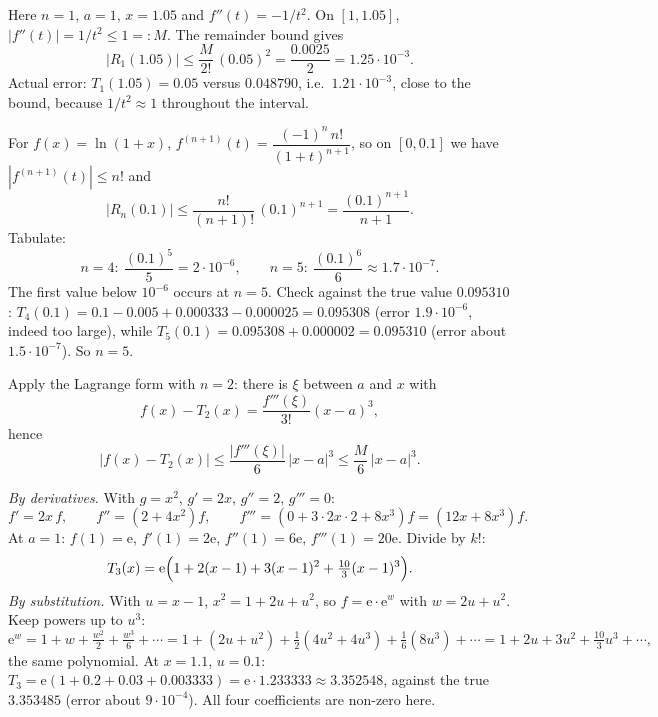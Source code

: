 \begin{solutions}
  \item Here $n=1$, $a=1$, $x=1.05$ and $f''(t)=-1/t^{2}$. On
        $[1,1.05]$, $|f''(t)|=1/t^{2}\leq 1=:M$. The remainder bound
        gives
        \[
          |R_{1}(1.05)|\leq\frac{M}{2!}\,(0.05)^{2}
            =\frac{0.0025}{2}=1.25\cdot 10^{-3} .
        \]
        Actual error: $T_{1}(1.05)=0.05$ versus $0.048790$, i.e.\
        $1.21\cdot 10^{-3}$, close to the bound, because
        $1/t^{2}\approx 1$ throughout the interval.

  \item For $f(x)=\ln(1+x)$,
        $f^{(n+1)}(t)=\dfrac{(-1)^{n}\,n!}{(1+t)^{n+1}}$, so on
        $[0,0.1]$ we have $|f^{(n+1)}(t)|\leq n!$ and
        \[
          |R_{n}(0.1)|\leq\frac{n!}{(n+1)!}\,(0.1)^{n+1}
            =\frac{(0.1)^{n+1}}{n+1} .
        \]
        Tabulate:
        \[
          n=4:\ \frac{(0.1)^{5}}{5}=2\cdot 10^{-6},
          \qquad
          n=5:\ \frac{(0.1)^{6}}{6}\approx 1.7\cdot 10^{-7} .
        \]
        The first value below $10^{-6}$ occurs at $n=5$. Check against
        the true value $0.095310$: $T_{4}(0.1)=0.1-0.005+0.000333
        -0.000025=0.095308$ (error $1.9\cdot 10^{-6}$, indeed too
        large), while $T_{5}(0.1)=0.095308+0.000002=0.095310$ (error
        about $1.5\cdot 10^{-7}$). So $n=5$.

  \item Apply the Lagrange form with $n=2$: there is $\xi$ between $a$
        and $x$ with
        \[
          f(x)-T_{2}(x)=\frac{f'''(\xi)}{3!}(x-a)^{3},
        \]
        hence
        \[
          |f(x)-T_{2}(x)|\leq\frac{|f'''(\xi)|}{6}\,|x-a|^{3}
            \leq\frac{M}{6}\,|x-a|^{3} .
        \]

  \item \emph{By derivatives.} With $g=x^{2}$, $g'=2x$, $g''=2$,
        $g'''=0$:
        \[
          f'=2x\,f,\qquad f''=(2+4x^{2})f,\qquad
          f'''=(0+3\cdot2x\cdot2+8x^{3})f=(12x+8x^{3})f .
        \]
        At $a=1$: $f(1)=\mathrm{e}$, $f'(1)=2\mathrm{e}$,
        $f''(1)=6\mathrm{e}$, $f'''(1)=20\mathrm{e}$. Divide by $k!$:
        \[
          T_{3}(x)=\mathrm{e}\Bigl(1+2(x-1)+3(x-1)^{2}
                   +\tfrac{10}{3}(x-1)^{3}\Bigr) .
        \]
        \emph{By substitution.} With $u=x-1$, $x^{2}=1+2u+u^{2}$, so
        $f=\mathrm{e}\cdot\mathrm{e}^{w}$ with $w=2u+u^{2}$. Keep powers up
        to $u^{3}$:
        \[
          \mathrm{e}^{w}=1+w+\tfrac{w^{2}}{2}+\tfrac{w^{3}}{6}+\cdots
          =1+(2u+u^{2})+\tfrac12(4u^{2}+4u^{3})+\tfrac16(8u^{3})+\cdots
          =1+2u+3u^{2}+\tfrac{10}{3}u^{3}+\cdots,
        \]
        the same polynomial. At $x=1.1$, $u=0.1$:
        $T_{3}=\mathrm{e}(1+0.2+0.03+0.003333)=\mathrm{e}\cdot1.233333
        \approx3.352548$, against the true $3.353485$ (error about
        $9\cdot10^{-4}$). All four coefficients are non-zero here.


\end{solutions}
